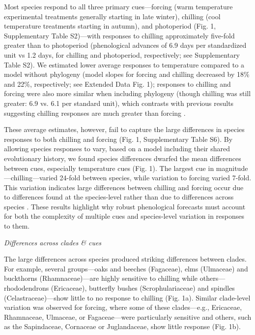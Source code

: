 \documentclass[11pt]{article}
\begin{document}
\par Most species respond to all three primary cues---forcing (warm temperature experimental treatments generally starting in late winter), chilling (cool temperature treatments starting in autumn), and photoperiod (Fig. 1, Supplementary Table S2)---with responses to chilling approximately five-fold greater than to photoperiod (phenological advances of 6.9 days per standardized unit vs 1.2 days, for chilling and photoperiod, respectively; see Supplementary Table S2). We estimated lower average responses to temperature compared to a model without phylogeny (model slopes for forcing and chilling decreased by 18\% and 22\%, respectively; see Extended Data Fig. 1); responses to chilling and forcing were also more similar when including phylogeny (though chilling was still greater: 6.9 vs. 6.1 per standard unit), which contrasts with previous results suggesting chilling responses are much greater than forcing  \citep{Laube:2014a,ettinger2020}. 

\par These average estimates, however, fail to capture the large differences in species responses to both chilling and forcing (Fig. 1, Supplementary Table S6). By allowing species responses to vary, based on a model including their shared evolutionary history, we found species differences dwarfed the mean differences between cues, especially temperature cues (Fig. 1). The largest cue in magnitude---chilling---varied 24-fold between species, while variation to forcing varied 7-fold. This variation indicates large differences between chilling and forcing occur due to differences found at the species-level rather than due to differences across species \citep[e.g., the average effect across species as previously suggested,][]{Laube:2014a,ettinger2020}. These results highlight why robust phenological forecasts must account for both the complexity of multiple cues and species-level variation in responses to them.

\emph{Differences across clades \& cues}

\par The large differences across species produced striking differences between clades. For example, several groups---oaks and
beeches (Fagaceae), elms (Ulmaceae) and buckthorns (Rhamnaceae)---are highly sensitive to chilling while others---rhododendrons (Ericaceae), butterfly bushes (Scrophulariaceae) and spindles (Celastraceae)---show little to no response to chilling  (Fig. 1a). Similar clade-level variation was observed for forcing, where some of these clades---e.g., Ericaceae, Rhamnaceae, Ulmaceae, or Fagaceae---were particularly sensitive and others, such as the Sapindaceae, Cornaceae or Juglandaceae, show little response (Fig. 1b). 
\end{document}

